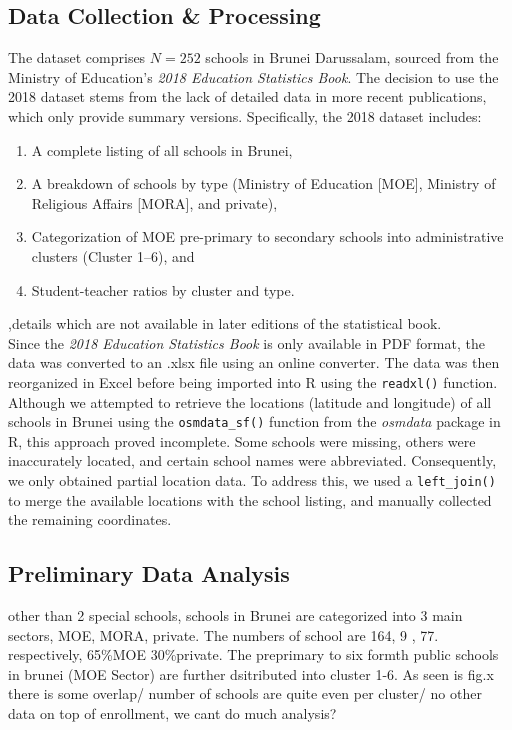 \documentclass[12pt]{article}
\begin{document}
\subsection{Data Collection \& Processing}
The dataset comprises \( N = 252 \) schools in Brunei Darussalam, sourced from the Ministry of Education’s \textit{2018 Education Statistics Book}. The decision to use the 2018 dataset stems from the lack of detailed data in more recent publications, which only provide summary versions. Specifically, the 2018 dataset includes:
\begin{enumerate}
    \item A complete listing of all schools in Brunei,
    \item A breakdown of schools by type (Ministry of Education [MOE], Ministry of Religious Affairs [MORA], and private),
    \item Categorization of MOE pre-primary to secondary schools into administrative clusters (Cluster 1–6), and
    \item Student-teacher ratios by cluster and type.
\end{enumerate}
,details which are not available in later editions of the statistical book. \\

Since the \textit{2018 Education Statistics Book} is only available in PDF format, the data was converted to an .xlsx file using an online converter. The data was then reorganized in Excel before being imported into R using the \texttt{readxl()} function. \\

Although we attempted to retrieve the locations (latitude and longitude) of all schools in Brunei using the \texttt{osmdata\_sf()} function from the \textit{osmdata} package in R, this approach proved incomplete. Some schools were missing, others were inaccurately located, and certain school names were abbreviated. Consequently, we only obtained partial location data. To address this, we used a \texttt{left\_join()} to merge the available locations with the school listing, and manually collected the remaining coordinates. \\


\subsection{Preliminary Data Analysis}
other than 2 special schools, schools in Brunei are categorized into 3 main sectors, MOE, MORA, private. The numbers of school are 164, 9 , 77. respectively, 65\%MOE 30\%private. The preprimary to six formth public schools in brunei (MOE Sector) are  further dsitributed into cluster 1-6. As seen is fig.x there is some overlap/ number of schools are quite even per cluster/ no other data on top of enrollment, we cant do much analysis?
\\ 
\end{document}
